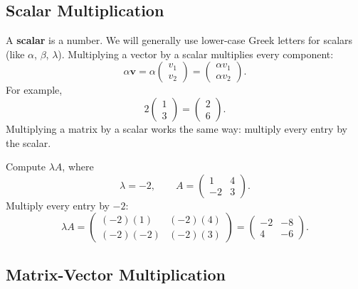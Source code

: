 \documentclass[10pt,letterpaper]{article}
\begin{document}
\subsection{Scalar Multiplication}

A \textbf{scalar} is a number. We will generally use
lower-case Greek letters for scalars (like
$\alpha$, $\beta$, $\lambda$).
Multiplying a vector by a scalar multiplies every component:
\[
\alpha\mathbf{v}
=
\alpha
\begin{pmatrix}
v_1\\v_2
\end{pmatrix}
=
\begin{pmatrix}
\alpha v_1\\\alpha v_2
\end{pmatrix}.
\]
For example,
\[
2\begin{pmatrix}1\\3\end{pmatrix}
=
\begin{pmatrix}2\\6\end{pmatrix}.
\]
Multiplying a matrix by a scalar works the same way:
multiply every entry by the scalar.

\begin{example}[3]{
Compute $\lambda A$, where
\[
\lambda=-2,
\qquad
A=
\begin{pmatrix}
1&4\\
-2&3
\end{pmatrix}.
\]
}
Multiply every entry by $-2$:
\[
\lambda A
=
\begin{pmatrix}
(-2)(1)&(-2)(4)\\
(-2)(-2)&(-2)(3)
\end{pmatrix}
=
\boxed{
\begin{pmatrix}
-2&-8\\
4&-6
\end{pmatrix}.
}
\]
\end{example}

\subsection{Matrix-Vector Multiplication}
\end{document}
